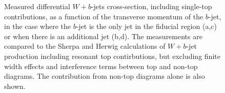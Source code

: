 \documentclass[floatfix]{article}
\begin{document}
\begin{figure}%
\centering
{}

\caption{\label{fig:unsubtracted}
Measured differential $W+b$-jets cross-section, including single-top contributions, as a function of the transverse momentum of the $b$-jet, 
in the case where the $b$-jet is the only jet in the fiducial region (a,c) or when there is an additional jet (b,d). 
The measurements are compared to the Sherpa and Herwig calculations of $W+b$-jet production including resonant top contirbutions, but excluding finite width effects 
and interference terms between top and non-top diagrams. The contribution from non-top diagrams alone is also shown.}
\end{figure}
\end{document}
